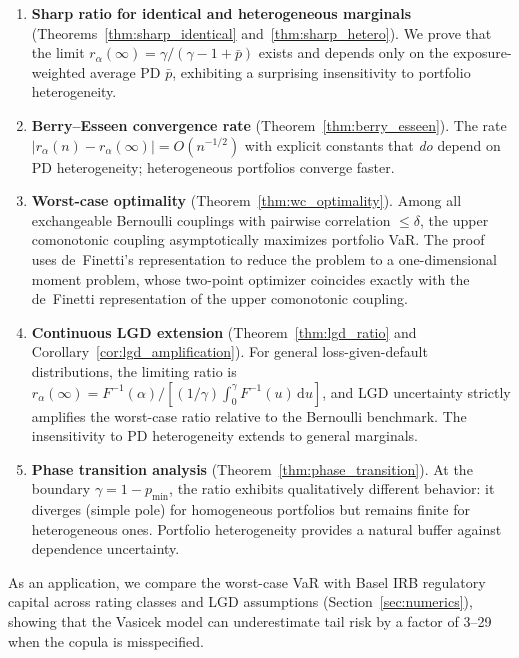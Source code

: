 \documentclass[11pt]{article}
\theoremstyle{definition}
\newcommand{\dd}{\mathrm{d}}
\newcommand{\1}{\mathbf{1}}
\begin{document}
\begin{enumerate}
  \item \textbf{Sharp ratio for identical and heterogeneous marginals} (Theorems~\ref{thm:sharp_identical} and~\ref{thm:sharp_hetero}). We prove that the limit $r_\alpha(\infty) = \gamma/(\gamma - 1 + \bar{p})$ exists and depends only on the exposure-weighted average PD $\bar{p}$, exhibiting a surprising insensitivity to portfolio heterogeneity.

  \item \textbf{Berry--Esseen convergence rate} (Theorem~\ref{thm:berry_esseen}). The rate $|r_\alpha(n) - r_\alpha(\infty)| = O(n^{-1/2})$ with explicit constants that \emph{do} depend on PD heterogeneity; heterogeneous portfolios converge faster.

  \item \textbf{Worst-case optimality} (Theorem~\ref{thm:wc_optimality}). Among all exchangeable Bernoulli couplings with pairwise correlation $\leq \delta$, the upper comonotonic coupling asymptotically maximizes portfolio VaR. The proof uses de~Finetti's representation to reduce the problem to a one-dimensional moment problem, whose two-point optimizer coincides exactly with the de~Finetti representation of the upper comonotonic coupling.

  \item \textbf{Continuous LGD extension} (Theorem~\ref{thm:lgd_ratio} and Corollary~\ref{cor:lgd_amplification}). For general loss-given-default distributions, the limiting ratio is $r_\alpha(\infty) = F^{-1}(\alpha) / [(1/\gamma)\int_0^\gamma F^{-1}(u)\,\dd u]$, and LGD uncertainty strictly amplifies the worst-case ratio relative to the Bernoulli benchmark. The insensitivity to PD heterogeneity extends to general marginals.

  \item \textbf{Phase transition analysis} (Theorem~\ref{thm:phase_transition}). At the boundary $\gamma = 1 - p_{\min}$, the ratio exhibits qualitatively different behavior: it diverges (simple pole) for homogeneous portfolios but remains finite for heterogeneous ones. Portfolio heterogeneity provides a natural buffer against dependence uncertainty.
\end{enumerate}

As an application, we compare the worst-case VaR with Basel IRB regulatory capital across rating classes and LGD assumptions (Section~\ref{sec:numerics}), showing that the Vasicek model can underestimate tail risk by a factor of 3--29 when the copula is misspecified.
\end{document}
